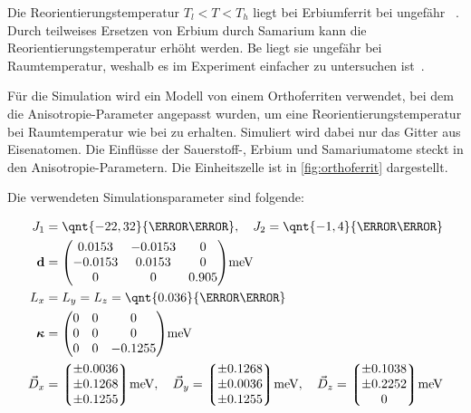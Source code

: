 \documentclass[main.tex]{subfiles}
\begin{document}

Die Reorientierungstemperatur \(T_l < T < T_h\) liegt bei Erbiumferrit bei ungefähr ~\cite{Deng2015}. 
Durch teilweises Ersetzen von Erbium durch Samarium kann die Reorientierungstemperatur erhöht werden. Be  liegt sie ungefähr bei Raumtemperatur, weshalb es im Experiment einfacher zu untersuchen ist~\cite{Fitzky2021}.


Für die Simulation wird ein Modell von einem Orthoferriten verwendet, bei dem
die Anisotropie-Parameter angepasst wurden, um eine Reorientierungstemperatur
bei Raumtemperatur wie bei  zu erhalten.
Simuliert wird dabei nur das Gitter aus Eisenatomen. Die Einflüsse der
Sauerstoff-, Erbium und Samariumatome steckt in den Anisotropie-Parametern. Die
Einheitszelle ist in \cref{fig:orthoferrit} dargestellt.

Die verwendeten Simulationsparameter sind folgende:

\begin{align}
	J_1           & = \qnt{-22,32}{\milli\electronvolt}, \quad J_2 =
	\qnt{-1,4}{\milli\electronvolt}\label{eq:params-exc}
	\\
	\mat{d}       & = \mqty(
	\num{0.0153}  & \num{-0.0153}                                   & 0
	\\
	\num{-0.0153} & \num{0.0153}                                    & 0
	\\
	0             & 0                                               &
	\num{0.905})\unit{\milli\electronvolt} \label{eq:params-2a}
	\\
	L_x           & = L_y = L_z =
	\qnt{0.036}{\milli\electronvolt}\label{eq:params-4a}
	\\
	\mat{\kappa}  & = \mqty(
	0             & 0                                               & 0
	\\
	0             & 0                                               & 0
	\\
	0             & 0                                               &
	\num{-0.1255})\unit{\milli\electronvolt} \label{eq:params-tia}
	\\
	\vec{D}_x     & = \mqty*(\num{\pm 0.0036}
	\\ \num{\pm 0.1268} \\ \num{\pm
		0.1255})\unit{\milli\electronvolt} , \quad
	\vec{D}_y = \mqty*(\num{\pm 0.1268}
	\\ \num{\pm 0.0036} \\ \num{\pm
		0.1255})\unit{\milli\electronvolt} , \quad
	\vec{D}_z = \mqty*(\num{\pm 0.1038}
	\\ \num{\pm 0.2252} \\ 0)\unit{\milli\electronvolt} \label{eq:params-dmi}
\end{align}
\end{document}
